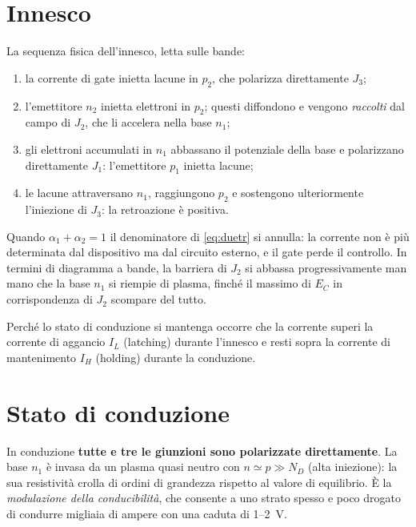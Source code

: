 \documentclass[11pt,a4paper]{article}
\begin{document}
\section{Innesco}

La sequenza fisica dell'innesco, letta sulle bande:
\begin{enumerate}\itemsep2pt
  \item la corrente di gate inietta lacune in $p_2$, che polarizza direttamente
        $J_3$;
  \item l'emettitore $n_2$ inietta elettroni in $p_2$; questi diffondono e vengono
        \emph{raccolti} dal campo di $J_2$, che li accelera nella base $n_1$;
  \item gli elettroni accumulati in $n_1$ abbassano il potenziale della base e
        polarizzano direttamente $J_1$: l'emettitore $p_1$ inietta lacune;
  \item le lacune attraversano $n_1$, raggiungono $p_2$ e sostengono
        ulteriormente l'iniezione di $J_3$: la retroazione è positiva.
\end{enumerate}
Quando $\alpha_1+\alpha_2=1$ il denominatore di \eqref{eq:duetr} si annulla: la
corrente non è più determinata dal dispositivo ma dal circuito esterno, e il gate
perde il controllo. In termini di diagramma a bande, la barriera di $J_2$ si
abbassa progressivamente man mano che la base $n_1$ si riempie di plasma, finché
il massimo di $E_C$ in corrispondenza di $J_2$ scompare del tutto.

Perché lo stato di conduzione si mantenga occorre che la corrente superi la
corrente di aggancio $I_L$ (latching) durante l'innesco e resti sopra la corrente
di mantenimento $I_H$ (holding) durante la conduzione.

\section{Stato di conduzione}

In conduzione \textbf{tutte e tre le giunzioni sono polarizzate direttamente}.
La base $n_1$ è invasa da un plasma quasi neutro con $n \simeq p \gg N_D$
(alta iniezione): la sua resistività crolla di ordini di grandezza rispetto al
valore di equilibrio. È la \emph{modulazione della conducibilità}, che consente a
uno strato spesso e poco drogato di condurre migliaia di ampere con una caduta di
1--2~V.
\end{document}
